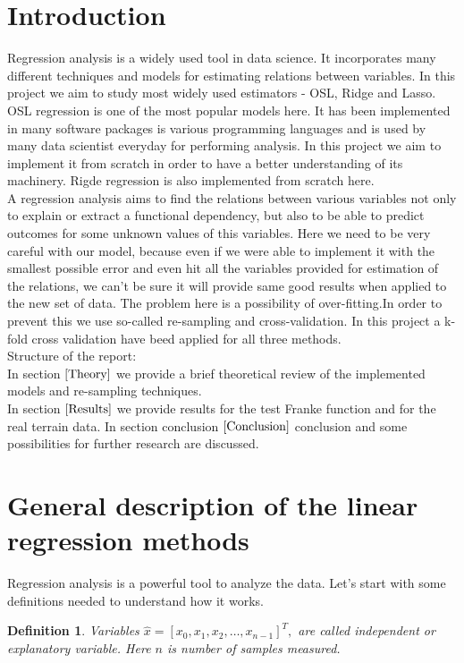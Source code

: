 \documentclass[10pt]{article}
\newtheorem{defn}{Definition}
\begin{document}
\section*{Introduction}
Regression analysis is a widely used tool in data science. It incorporates many different techniques and models for estimating relations between variables. In this project we aim to study most widely used estimators - OSL, Ridge and Lasso.
OSL regression is one of the most popular models here. It has been implemented in many software packages is various programming languages and is used by many data scientist everyday for performing analysis. In this project we aim to implement it from scratch in order to have a better understanding of its machinery. Rigde regression is also implemented from scratch here. \\
A regression analysis aims to find the relations between various variables not only to explain or extract a functional dependency, but also to be able to predict outcomes for some unknown values of this variables. Here we need to be very careful with our model, because even if we were able to implement it with the smallest possible error and even hit all the variables provided for estimation of the relations, we can't be sure it will provide same good results when applied to the new set of data. The problem here is a possibility of over-fitting.In order to prevent this we use so-called re-sampling and cross-validation. In this project a k-fold cross validation have beed applied for all three methods. \\
Structure of the report:\\
In section $\ref{Theory}$ we provide a brief theoretical review of the implemented models and re-sampling techniques.\\
In section $\ref{Results}$ we provide results for the test Franke function and for the real terrain data.
In section conclusion $\ref{Conclusion}$ conclusion and some possibilities for further research are discussed.

\section{General description of the linear regression methods} \label{Theory}
Regression analysis is a powerful tool to analyze the data. Let's start with some definitions needed to understand how it works.
\begin{defn}
Variables $\hat{x} = [x_0,x_1, x_2,\dots, x_{n-1}]^T,$ are called independent  or explanatory variable. Here $n$ is number of samples measured.
\end{defn}
\end{document}
